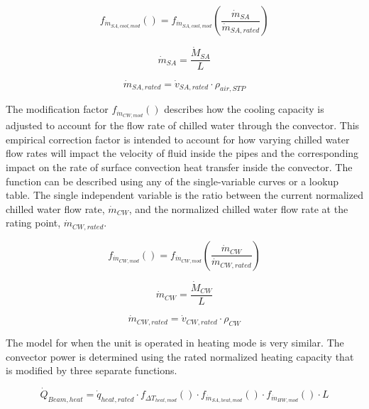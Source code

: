 \begin{equation}
  {f_{\dot m_{SA,cool,mod}}()} = f_{\dot m_{SA,cool,mod}}\left(\frac{{\dot m_{SA}}}{{\dot m_{SA,rated}} }\right)
\end{equation}

\begin{equation}
  {\dot m_{SA}} = \frac{\dot M_{SA}}{L}
\end{equation}

\begin{equation}
  {\dot m_{SA,rated}} = {\dot v_{SA,rated}} \cdot {\rho_{air,STP}}
\end{equation}

The modification factor \(f_{\dot m_{CW,mod}}()\) describes how the cooling capacity is adjusted to account for the flow rate of chilled water through the convector. This empirical correction factor is intended to account for how varying chilled water flow rates will impact the velocity of fluid inside the pipes and the corresponding impact on the rate of surface convection heat transfer inside the convector. The function can be described using any of the single-variable curves or a lookup table. The single independent variable is the ratio between the current normalized chilled water flow rate, \({\dot m_{CW}}\), and the normalized chilled water flow rate at the rating point, \({\dot m_{CW,rated}}\).

\begin{equation}
  {f_{\dot m_{CW,mod}}()} = f_{\dot m_{CW,mod}}\left(\frac{{\dot m_{CW}}}{{\dot m_{CW,rated}}}\right)
\end{equation}

\begin{equation}
  {\dot m_{CW}} = \frac{\dot M_{CW}}{L}
\end{equation}

\begin{equation}
  {\dot m_{CW,rated}} = {\dot v_{CW,rated}} \cdot {\rho_{CW}}
\end{equation}

The model for when the unit is operated in heating mode is very similar. The convector power is determined using the rated normalized heating capacity that is modified by three separate functions.

\begin{equation}
{\dot Q_{Beam, heat}} = {\dot q_{heat,rated}}\cdot f_{ \Delta T_{heat,mod} }() \cdot f_{\dot m_{SA,heat,mod}}()\cdot f_{\dot m_{HW,mod}}() \cdot L
\end{equation}

